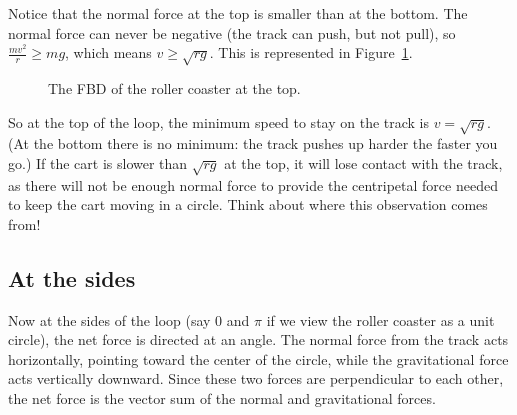 Notice that the normal force at the top is smaller than at the bottom.
The normal force can never be negative (the track can push, but not pull),
so $\frac{mv^2}{r} \ge mg$, which means $v \ge \sqrt{rg}$. This is represented in Figure~\ref{fig:roller_top}.

\begin{figure}[H]
  \centering
  \caption{The FBD of the roller coaster at the top.}
  \label{fig:roller_top}
\end{figure}

So at the top of the loop, the minimum speed to stay on the track is
$v = \sqrt{rg}$. (At the bottom there is no minimum: the track pushes up
harder the faster you go.) If the cart is slower than $\sqrt{rg}$ at the
top, it will lose contact with the track, as there will not be enough normal force to provide the centripetal force needed to keep the cart moving in a circle. Think about where this observation comes from!

\subsection{At the sides}
Now at the sides of the loop (say $0$ and $\pi$ if we view the roller coaster as a unit circle), the net force is directed at an angle. The normal force from the track acts horizontally, pointing toward the center of the circle, while the gravitational force acts vertically downward. Since these two forces are perpendicular to each other, the net force is the vector sum of the normal and gravitational forces.

